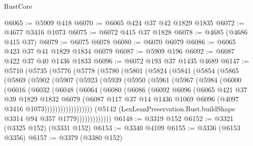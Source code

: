 \begin{lexlean}{RustCore}
\begin{coremodule}
@6065 := @5909 @418
@6070 := @6065 @424 @37 @42 @1829 @1835
@6072 := @4677 @3416 @1073
@6075 := @6072 @415 @37 @1828
@6078 := @4685 (@4686 @415 @37)
@6079 := @6075 @6078
@6080 := @6070 @6079
@6086 := @6065 @423 @37 @41 @1829 @1834 @6079
@6087 := @5909 @196
@6092 := @6087 @422 @37 @40 @1436 @1833
@6096 := @6072 @193 @37 @1435 @4689
@6147 := @5710
    (@5735
      (@5776
        (@5778
          (@5780
            (@5801
              (@5824
                (@5841
                  (@5854
                    (@5865
                      (@5869
                        (@5902
                          (@5907
                            (@5923
                              (@5939
                                (@5950
                                  (@5961
                                    (@5967
                                      (@5984
                                        (@6000
                                          (@6016
                                            (@6032
                                              (@6048
                                                (@6064
                                                  (@6080
                                                    (@6086
                                                      (@6092
                                                        @6096
                                                        (@6065
                                                          @421
                                                          @37
                                                          @39
                                                          @1829
                                                          @1832
                                                          @6079
                                                          (@6087
                                                            @117
                                                            @37
                                                            @14
                                                            @1436
                                                            @1069
                                                            @6096
                                                            (@4097 @3416 @1073))))))))))))))))))
                          (@5142
                            (LexLeanPreservation.Rust.buildShape @3314 @94 @357 @1779)))))))))))))
@6148 := @3319 @152
@6152 := @3321 (@3325 @152) (@3331 @152)
@6153 := @3340 @4109
@6155 := @3336 (@6153 @3356)
@6157 := @3379 (@3380 @152)

\end{coremodule}
\end{lexlean}
